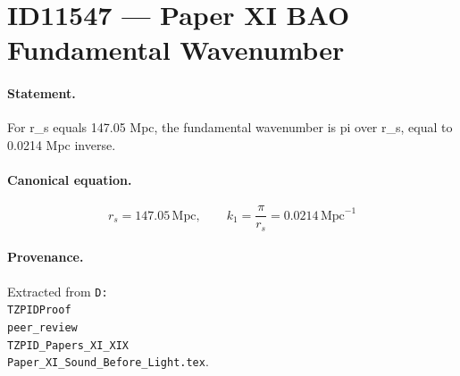 \section*{ID11547 --- Paper XI BAO Fundamental Wavenumber}

\paragraph{Statement.}
For r_s equals 147.05 Mpc, the fundamental wavenumber is pi over r_s, equal to 0.0214 Mpc inverse.

\paragraph{Canonical equation.}
\[
r_s=147.05\,\mathrm{Mpc},\qquad k_1=\frac{\pi}{r_s}=0.0214\,\mathrm{Mpc}^{-1}
\]

\paragraph{Provenance.}
Extracted from \texttt{D:\\TZPIDProof\\peer\_review\\TZPID\_Papers\_XI\_XIX\\Paper\_XI\_Sound\_Before\_Light.tex}.
